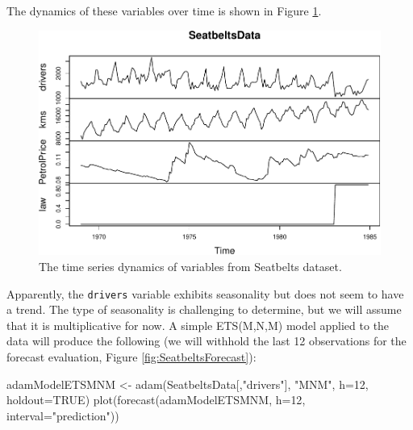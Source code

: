 \documentclass[
]{book}
\newenvironment{Shaded}{\begin{snugshade}}{\end{snugshade}}
\newcommand{\AttributeTok}[1]{\textcolor[rgb]{0.77,0.63,0.00}{#1}}
\newcommand{\ConstantTok}[1]{\textcolor[rgb]{0.00,0.00,0.00}{#1}}
\newcommand{\DecValTok}[1]{\textcolor[rgb]{0.00,0.00,0.81}{#1}}
\newcommand{\FunctionTok}[1]{\textcolor[rgb]{0.00,0.00,0.00}{#1}}
\newcommand{\NormalTok}[1]{#1}
\newcommand{\OtherTok}[1]{\textcolor[rgb]{0.56,0.35,0.01}{#1}}
\newcommand{\StringTok}[1]{\textcolor[rgb]{0.31,0.60,0.02}{#1}}
\theoremstyle{definition}
\theoremstyle{definition}
\theoremstyle{definition}
\theoremstyle{definition}
\theoremstyle{remark}
\begin{document}
The dynamics of these variables over time is shown in Figure \ref{fig:Seatbelts}.

\begin{figure}
\centering
\includegraphics{Svetunkov--2022----ADAM_files/figure-latex/Seatbelts-1.pdf}
\caption{\label{fig:Seatbelts}The time series dynamics of variables from Seatbelts dataset.}
\end{figure}

Apparently, the \texttt{drivers} variable exhibits seasonality but does not seem to have a trend. The type of seasonality is challenging to determine, but we will assume that it is multiplicative for now. A simple ETS(M,N,M) model applied to the data will produce the following (we will withhold the last 12 observations for the forecast evaluation, Figure \ref{fig:SeatbeltsForecast}):

\begin{Shaded}
\begin{Highlighting}[]
\NormalTok{adamModelETSMNM }\OtherTok{\textless{}{-}} \FunctionTok{adam}\NormalTok{(SeatbeltsData[,}\StringTok{"drivers"}\NormalTok{], }\StringTok{"MNM"}\NormalTok{,}
                        \AttributeTok{h=}\DecValTok{12}\NormalTok{, }\AttributeTok{holdout=}\ConstantTok{TRUE}\NormalTok{)}
\FunctionTok{plot}\NormalTok{(}\FunctionTok{forecast}\NormalTok{(adamModelETSMNM, }\AttributeTok{h=}\DecValTok{12}\NormalTok{, }\AttributeTok{interval=}\StringTok{"prediction"}\NormalTok{))}
\end{Highlighting}
\end{Shaded}
\end{document}
